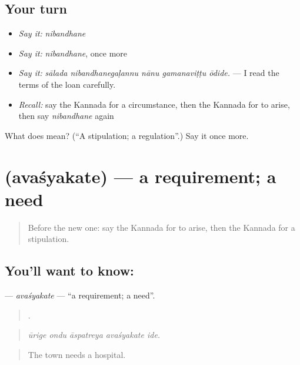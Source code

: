 \subsection*{Your turn}
\begin{itemize}
\raggedright
  \item \emph{Say it:} \emph{nibandhane}
  \item \emph{Say it:} \emph{nibandhane}, once more
  \item \emph{Say it:} \emph{sālada nibandhanegaḷannu nānu gamanaviṭṭu ōdide.} — I read the terms of the loan carefully.
  \item \emph{Recall:} say the Kannada for a circumstance, then the Kannada for to arise, then say \emph{nibandhane} again
\end{itemize}

\begin{tcolorbox}[breakable,colback=teal!4,colframe=teal!35!black,title={Before you move on}]
What does  mean? (\textquotedblleft{}A stipulation; a regulation\textquotedblright{}.) Say it once more.
\end{tcolorbox}
\section[\texorpdfstring{\kn{ಅವಶ್ಯಕತೆ} (avaśyakate)}{ಅವಶ್ಯಕತೆ (avaśyakate)}]{ (avaśyakate) — a requirement; a need}

\label{lesson:KA-C430-avasyakate}



\begin{quote}
Before the new one: say the Kannada for to arise, then the Kannada for a stipulation.
\end{quote}

\subsection*{You'll want to know: }
\textbf{} — \emph{avaśyakate} — \textquotedblleft{}a requirement; a need\textquotedblright{}.

\begin{quote}
    .
\end{quote}

\begin{quote}
\emph{ūrige ondu āspatreya avaśyakate ide.}
\end{quote}

\begin{quote}
The town needs a hospital.
\end{quote}

